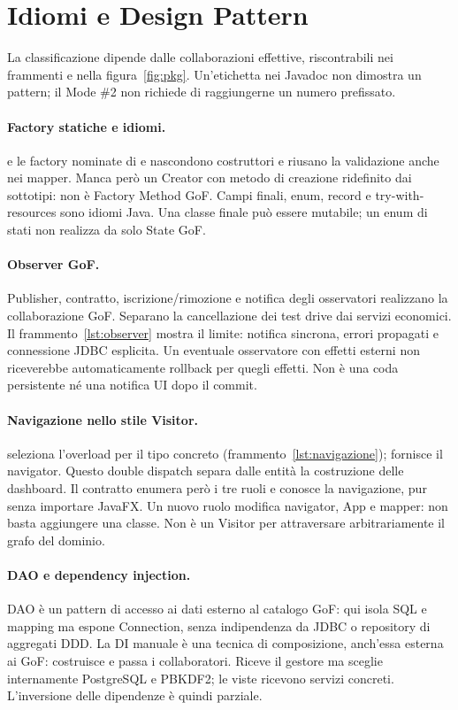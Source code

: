 \section{Idiomi e Design Pattern}\label{sec:impl-pattern}
La classificazione dipende dalle collaborazioni effettive, riscontrabili
nei frammenti e nella figura~\ref{fig:pkg}. Un'etichetta nei Javadoc
non dimostra un pattern; il Mode \#2 non richiede di raggiungerne un
numero prefissato.

\paragraph{Factory statiche e idiomi.}
 e le factory nominate di  e
 nascondono costruttori e riusano la validazione anche nei
mapper. Manca però un Creator con metodo di creazione ridefinito dai
sottotipi: non è Factory Method GoF. Campi finali, enum, record e
try-with-resources sono idiomi Java. Una classe finale può essere mutabile;
un enum di stati non realizza da solo State GoF.

\paragraph{Observer GoF.}
Publisher, contratto, iscrizione/rimozione e notifica degli osservatori
realizzano la collaborazione GoF. Separano la cancellazione dei test drive
dai servizi economici. Il frammento~\ref{lst:observer} mostra il limite:
notifica sincrona, errori propagati e connessione JDBC esplicita.
Un eventuale osservatore con effetti esterni non riceverebbe automaticamente
rollback per quegli effetti. Non è una coda persistente né una notifica UI
dopo il commit.

\paragraph{Navigazione nello stile Visitor.}
 seleziona l'overload per il tipo concreto
(frammento~\ref{lst:navigazione});  fornisce il navigator.
Questo double dispatch separa dalle entità la costruzione delle dashboard.
Il contratto enumera però i tre ruoli e  conosce la navigazione,
pur senza importare JavaFX. Un nuovo ruolo modifica navigator, App e mapper:
non basta aggiungere una classe. Non è un Visitor per attraversare
arbitrariamente il grafo del dominio.

\paragraph{DAO e dependency injection.}
DAO è un pattern di accesso ai dati esterno al catalogo GoF: qui isola SQL
e mapping ma espone Connection, senza indipendenza da JDBC o repository
di aggregati DDD. La DI manuale è una tecnica di composizione, anch'essa
esterna ai GoF:  costruisce e passa i collaboratori.
Riceve il gestore ma sceglie internamente PostgreSQL e PBKDF2; le viste
ricevono servizi concreti. L'inversione delle dipendenze è quindi parziale.

